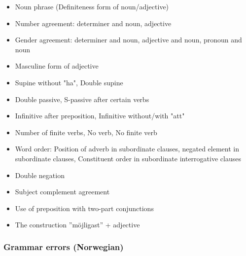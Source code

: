 \documentclass[a4paper,english,12pt]{article}
\begin{document}
\begin{spacing}{1.0}
\begin{itemize}
    \item Noun phrase (Definiteness form of noun/adjective)
    \item Number agreement: determiner and noun, adjective
    \item Gender agreement: determiner and noun, adjective and noun, pronoun and noun 
    \item Masculine form of adjective %
	\item	 Supine without "ha",    Double supine 
	\item    Double passive,    S-passive after certain verbs   
	\item  Infinitive after preposition, Infinitive without/with "att"
	\item    Number of finite verbs, No verb, No finite verb
	\item   Word order:  Position of adverb in subordinate clauses, negated element in subordinate clauses, Constituent order in subordinate interrogative clauses
	\item    Double negation
	\item     Subject complement agreement
	\item    Use of preposition with two-part conjunctions 
	\item    The construction ”möjligast” + adjective
\end{itemize}

\subsubsection{Grammar errors (Norwegian)}



\end{spacing}
\end{document}
